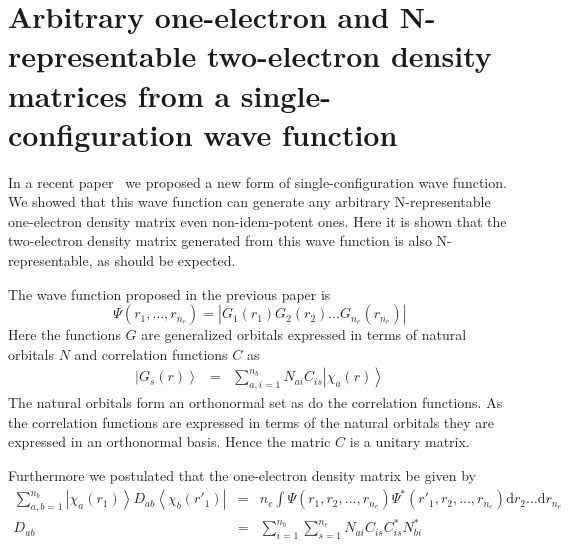 \documentclass[pra]{revtex4-1}
\begin{document}
\section{Arbitrary one-electron and N-representable two-electron density
         matrices from a single-configuration wave function}

In a recent paper~\cite{van_Dam_2016} we proposed a new form of single-configuration
wave function. We showed that this wave function can generate any arbitrary
N-representable one-electron density matrix even non-idem-potent ones. Here
it is shown that the two-electron density matrix generated from this wave
function is also N-representable, as should be expected. 

The wave function proposed in the previous paper is~\cite{van_Dam_2016}
\begin{equation}
   \Psi(r_1,\ldots,r_{n_e})
   = \left|G_1(r_1)G_2(r_2)\ldots G_{n_e}(r_{n_e})\right|
   \label{Eq:wavefunction}
\end{equation}
Here the functions $G$ are generalized orbitals expressed in terms of natural
orbitals $N$ and correlation functions $C$ as
\begin{eqnarray}
   \left|G_s(r)\right\rangle
   &=& \sum_{a,i=1}^{n_b} N_{ai}C_{is}\left|\chi_a(r)\right\rangle
   \label{Eq:genorb}
\end{eqnarray}
The natural orbitals form an orthonormal set as do the correlation functions.
As the correlation functions are expressed in terms of the natural orbitals
they are expressed in an orthonormal basis. Hence the matric $C$ is a
unitary matrix.

Furthermore we postulated that the one-electron density matrix be given by
\begin{eqnarray}
  \sum_{a,b=1}^{n_b}\left|\chi_a(r_1)\right\rangle D_{ab}
                    \left\langle\chi_b(r'_1)\right|
  &=& n_e \int \Psi(r_1,r_2,\ldots,r_{n_e})\Psi^*(r'_1,r_2,\ldots,r_{n_e})
      \mathrm{d}r_2 \ldots \mathrm{d}r_{n_e} \\
  D_{ab}
  &=& \sum_{i=1}^{n_b}\sum_{s=1}^{n_e} N_{ai}C_{is}C^*_{is}N^*_{bi}
      \label{Eq:1densmat}
\end{eqnarray}
\end{document}
